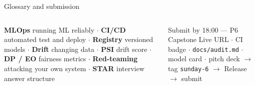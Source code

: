 \documentclass[aspectratio=169,11pt]{beamer}
\begin{document}
\begin{frame}{Glossary and submission}
\begin{columns}[T]
\begin{bdef}[Glossary]
\textbf{MLOps} running ML reliably $\cdot$ \textbf{CI/CD} automated test and deploy $\cdot$ \textbf{Registry} versioned models $\cdot$ \textbf{Drift} changing data $\cdot$ \textbf{PSI} drift score $\cdot$ \textbf{DP / EO} fairness metrics $\cdot$ \textbf{Red-teaming} attacking your own system $\cdot$ \textbf{STAR} interview answer structure
\end{bdef}
\begin{block}{Submit by 18:00 --- P6 Capstone}
Live URL $\cdot$ CI badge $\cdot$ \texttt{docs/audit.md} $\cdot$ model card $\cdot$ pitch deck $\rightarrow$ tag \texttt{sunday-6} $\rightarrow$ Release $\rightarrow$ submit
\end{block}
\end{columns}
\end{frame}
\end{document}
